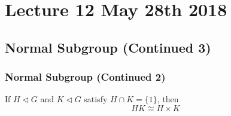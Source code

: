 \chapter{Lecture 12 May 28th 2018}%
\label{chp:lecture_12_may_28th_2018}

\section{Normal Subgroup (Continued 3)}%
\label{sec:normal_subgroup_continued_3}

\subsection{Normal Subgroup (Continued 2)}%
\label{sub:normal_subgroup_continued_2}

\begin{thm}
\label{thm:product_and_cross_product_of_normal_subgroups_are_isomorphic}
  If $H \triangleleft G$ and $K \triangleleft G$ satisfy $H \cap K = \{ 1 \}$, then
  \begin{equation*}
    HK \cong H \times K
  \end{equation*}
\end{thm}

